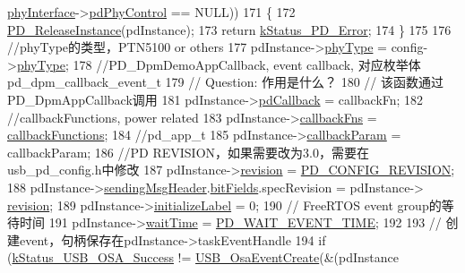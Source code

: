 \begin{DoxyCode}
      \hyperlink{struct__pd__instance_adbed7b2cd53df40e0611a8879c903339}{phyInterface}->\hyperlink{struct__pd__phy__api__interface_a5e422dbfd66fca34934e39b451f17094}{pdPhyControl} == NULL))
171     \{
172         \hyperlink{usb__pd__interface_8c_a8c50cfda5ec549f60ac482d06231d26f}{PD\_ReleaseInstance}(pdInstance);
173         \textcolor{keywordflow}{return} \hyperlink{group__usb__pd__stack_ggaaad4cd00dd02567c6169429e3a895073a4d58370b8ee8d3d2a4c477f7a3f84dda}{kStatus\_PD\_Error};
174     \}
175 
176     \textcolor{comment}{//phyType的类型，PTN5100 or others}
177     pdInstance->\hyperlink{struct__pd__instance_afae58a0b309262dc37fac1f4f92c6d7b}{phyType} = config->\hyperlink{struct__pd__instance__config_a1f5e597bbfc0af871a5e887c34eb3aca}{phyType};
178     \textcolor{comment}{//PD\_DpmDemoAppCallback, event callback, 对应枚举体pd\_dpm\_callback\_event\_t}
179     \textcolor{comment}{// Question: 作用是什么？}
180     \textcolor{comment}{// 该函数通过PD\_DpmAppCallback调用}
181     pdInstance->\hyperlink{struct__pd__instance_a3718a4d773d48136d66706ac063ef948}{pdCallback} = callbackFn;
182     \textcolor{comment}{//callbackFunctions, power related}
183     pdInstance->\hyperlink{struct__pd__instance_a519457e415e4eb39231c3e32316ffc83}{callbackFns} = \hyperlink{pd__app_8c_a306f9b8029582dfb8c64f163fea3cf65}{callbackFunctions};
184     \textcolor{comment}{//pd\_app\_t}
185     pdInstance->\hyperlink{struct__pd__instance_a0eb7710a55cb5eb2a57355d772b26f74}{callbackParam} = callbackParam;
186     \textcolor{comment}{//PD REVISION，如果需要改为3.0，需要在usb\_pd\_config.h中修改}
187     pdInstance->\hyperlink{struct__pd__instance_af7c28b72771ce442ee733892186c4e6c}{revision} = \hyperlink{usb__pd__config_8h_a3d9825e8371d36b868d61b94a6514711}{PD\_CONFIG\_REVISION};
188     pdInstance->\hyperlink{struct__pd__instance_a6031ed1c3ec10c04ea5daf9a76485f68}{sendingMsgHeader}.\hyperlink{struct__pd__msg__header_a6dc4609c23d8d9e5d8830177d959fe17}{bitFields}.specRevision = pdInstance->
      \hyperlink{struct__pd__instance_af7c28b72771ce442ee733892186c4e6c}{revision};
189     pdInstance->\hyperlink{struct__pd__instance_a2edcb21b9d568937192741d32381d2b1}{initializeLabel} = 0;
190     \textcolor{comment}{// FreeRTOS event group的等待时间}
191     pdInstance->\hyperlink{struct__pd__instance_a2505651a0001ea647306dbd800927778}{waitTime} = \hyperlink{usb__pd__interface_8h_ac3471f042971fd1641303f2622b844c1}{PD\_WAIT\_EVENT\_TIME};
192 
193     \textcolor{comment}{// 创建event，句柄保存在pdInstance->taskEventHandle}
194     \textcolor{keywordflow}{if} (\hyperlink{group__usb__os__abstraction_gga453ebd2f93aafb8c938c3a23c815f9bdab90805fb75297fda1ca60dbb2283f933}{kStatus\_USB\_OSA\_Success} != \hyperlink{group__usb__os__abstraction_gaf38d525580499ff2657303eb807efc61}{USB\_OsaEventCreate}(&(pdInstance

\end{DoxyCode}
